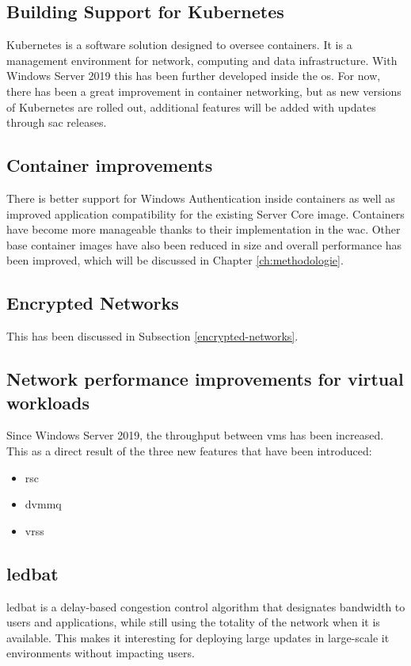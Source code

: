 \subsection*{Building Support for Kubernetes}
Kubernetes is a software solution designed to oversee containers. 
It is a management environment for network, computing and data infrastructure. 
With Windows Server 2019 this has been further developed inside the \acrshort{os}. 
For now, there has been a great improvement in container networking, but as new versions of Kubernetes are rolled out, additional features will be added with updates through \acrfull{sac} releases.
\subsection*{Container improvements}
There is better support for Windows Authentication inside containers as well as improved application compatibility for the existing Server Core image. 
Containers have become more manageable thanks to their implementation in the \acrlong{wac}.
Other base container images have also been reduced in size and overall performance has been improved, which will be discussed in Chapter \ref{ch:methodologie}. 
\subsection*{Encrypted Networks}
This has been discussed in Subsection \ref{encrypted-networks}.
\subsection*{Network performance improvements for virtual workloads}
Since Windows Server 2019, the throughput between \acrshort{vm}s has been increased. 
This as a direct result of the three new features that have been introduced:
\begin{itemize}
	\item \acrfull{rsc}
	\item \acrfull{dvmmq}
	\item \acrfull{vrss}
\end{itemize}
\subsection*{\acrfull{ledbat}}
\acrshort{ledbat} is a delay-based congestion control algorithm that designates bandwidth to users and applications, while still using the totality of the network when it is available. \autocite{Shalunov2012}
This makes it interesting for deploying large updates in large-scale \acrshort{it} environments without impacting users.
